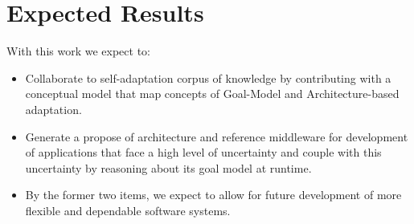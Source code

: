 \section{Expected Results}

With this work we expect to:

\begin{itemize}
\item Collaborate to self-adaptation corpus of knowledge by contributing with a conceptual model that map concepts of Goal-Model and Architecture-based adaptation.

\item Generate a propose of architecture and reference middleware for development of applications that face a high level of uncertainty and couple with this uncertainty by reasoning about its goal model at runtime.

\item By the former two items, we expect to allow for future development of more flexible and dependable software systems.

\end{itemize}
